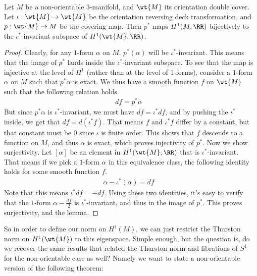 \begin{lem}
    Let $M$ be a non-orientable $3$-manifold, and $\wt{M}$ its orientation double cover. Let $\iota: \wt{M} \to \wt{M}$ be the orientation reversing deck transformation, and $p: \wt{M} \to M$ be the covering map. Then $p^{\ast}$ maps $H^1(M, \RR)$ bijectively to the $\iota^{\ast}$-invariant subspace of $H^1(\wt{M}, \RR)$.
\end{lem}
\begin{proof}
    Clearly, for any $1$-form $\alpha$ on $M$, $p^{\ast}(\alpha)$ will be $\iota^{\ast}$-invariant. This means that the image of $p^{\ast}$ lands inside the $\iota^{\ast}$-invariant subspace. To see that the map is injective at the level of $H^1$ (rather than at the level of $1$-forms), consider a $1$-form $\alpha$ on $M$ such that $p^{\ast}\alpha$ is exact. We thus have a smooth function $f$ on $\wt{M}$ such that the following relation holds.
    \begin{align*}
        df = p^{\ast} \alpha
    \end{align*}
    But since $p^{\ast}\alpha$ is $\iota^{\ast}$-invariant, we must have $df = \iota^{\ast} df$, and by pushing the $\iota^{\ast}$ inside, we get that $df = d(\iota^{\ast}f)$. That means $f$ and $\iota^{\ast}f$ differ by a constant, but that constant must be $0$ since $\iota$ is finite order. This shows that $f$ descends to a function on $M$, and thus $\alpha$ is exact, which proves injectivity of $p^{\ast}$. Now we show surjectivity. Let $[\alpha]$ be an element in $H^1(\wt{M}, \RR)$ that is $\iota^{\ast}$-invariant. That means if we pick a $1$-form $\alpha$ in this equivalence class, the following identity holds for some smooth function $f$.
    \begin{align*}
        \alpha - \iota^{\ast}(\alpha) = df
    \end{align*}
    Note that this means $\iota^{\ast}df = -df$. Using these two identities, it's easy to verify that the $1$-form $\alpha - \frac{df}{2}$ is $\iota^{\ast}$-invariant, and thus in the image of $p^{\ast}$. This proves surjectivity, and the lemma.
\end{proof}

So in order to define our norm on $H^1(M)$, we can just restrict the Thurston norm on $H^1(\wt{M})$ to this eigenspace. Simple enough, but the question is, do we recover the same results that related the Thurston norm and fibrations of $S^1$ for the non-orientable case as well? Namely we want to state a non-orientable version of the following theorem:

